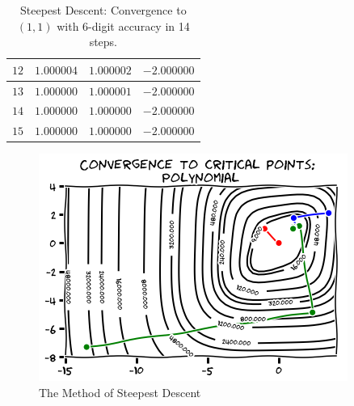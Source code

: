 \begin{example}
\begin{itemize}
\begin{table}[ht!]
\begin{tabular}{|r|r|r|r|}
	$12$ & $1.000004$ & $1.000002$ & $-2.000000$ \\ \hline 
	$13$ & $1.000000$ & $1.000001$ & $-2.000000$ \\ \hline 
	$14$ & $1.000000$ & $1.000000$ & $-2.000000$ \\ \hline 
	$15$ & $1.000000$ & $1.000000$ & $-2.000000$ \\ \hline 
	\end{tabular}
	\caption{Steepest Descent: Convergence to $(1,1)$ with 6-digit accuracy in 14 steps.}
	\label{table:SD-1-1}
	\end{table}
\end{itemize}
\begin{figure}[ht!]
\includegraphics[width=0.6\linewidth]{convergenceSteepest.png}
\caption{The Method of Steepest Descent}
\label{figure:SteepestConvergence}
\end{figure}
\end{example}

